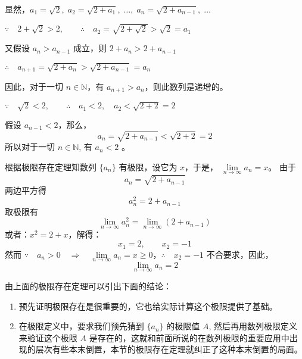 \begin{solution}
显然，$a_1=\sqrt{2},\;a_2=\sqrt{2+a_1},\;\ldots,\;
a_n=\sqrt{2+a_{n-1}},\;\ldots$

$\because\quad 2+\sqrt{2}>2,\qquad \therefore\quad a_2=\sqrt{2+\sqrt{2}}>\sqrt{2}=a_1$

又假设 $a_n>a_{n-1}$ 成立，则 $2+a_n>2+a_{n-1}$

$\therefore\quad a_{n+1}=\sqrt{2+a_n}>\sqrt{2+a_{n-1}}=a_n$

因此，对于一切 $n\in\mathbb{N}$，有 $a_{n+1}>a_n$，则此数列是递增的。

$\because\quad \sqrt{2}<2,\qquad \therefore\quad a_1<2,\quad a_2<\sqrt{2+2}=2$

假设 $a_{n-1}<2$，那么，
\[a_n=\sqrt{2+a_{n-1}}<\sqrt{2+2}=2\]
所以对于一切 $n\in\mathbb{N}$, 有 $a_n<2$ 。

根据极限存在定理知数列 $\{a_n\}$ 有极限，设它为 $x$，于是，
$\lim\limits_{n\to\infty}a_n=x$。
由于
\[a_n=\sqrt{2+a_{n-1}}\]
两边平方得
\[a^2_n={2+a_{n-1}}\]
取极限有
\[\lim_{n\to\infty}a^2_n =\lim_{n\to\infty}(2+a_{n-1})\]
或者：$x^2=2+x$，解得：
\[x_1=2,\qquad x_2=-1\]
然而 $\because\quad a_n>0\quad \Longrightarrow\quad \lim\limits_{n\to\infty}a_n=x\geqslant 0$，$\therefore\quad x_2=-1$ 不合要求，因此，
\[\lim_{n\to\infty}a_n=2\]
\end{solution}

由上面的极限存在定理可以引出下面的结论：
\begin{enumerate}
  \item 预先证明极限存在是很重要的，它也给实际计算这个极限提供了基础。
  \item 在极限定义中，要求我们预先猜到 $\{a_n\}$ 的极限值 $A$, 然后再用数列极限定义来验证这个极限 $A$ 是存在的，这就和前面所说的在数列极限的重要应用中出现的层次有些本末倒置，本节的极限存在定理就纠正了这种本末倒置的局面。
\end{enumerate}

